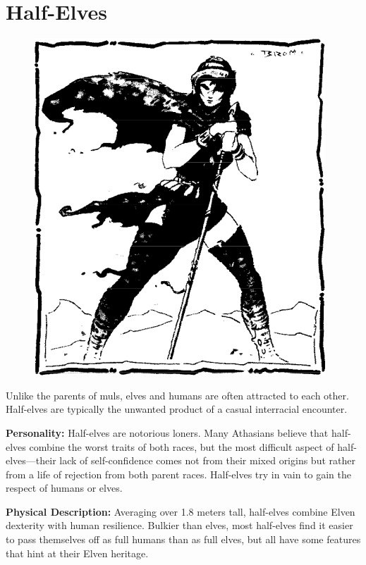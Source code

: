 \vskip2cm
\section{Half-Elves}

\begin{figure}[b!]
\centering
\includegraphics[width=\columnwidth]{images/halfelf-1.png}
\WOTC
\end{figure}
Unlike the parents of muls, elves and humans are often attracted to each other. Half-elves are typically the unwanted product of a casual interracial encounter.

\textbf{Personality:} Half-elves are notorious loners. Many Athasians believe that half-elves combine the worst traits of both races, but the most difficult aspect of half-elves---their lack of self-confidence comes not from their mixed origins but rather from a life of rejection from both parent races. Half-elves try in vain to gain the respect of humans or elves.

\textbf{Physical Description:} Averaging over 1.8 meters tall, half-elves combine Elven dexterity with human resilience. Bulkier than elves, most half-elves find it easier to pass themselves off as full humans than as full elves, but all have some features that hint at their Elven heritage.

